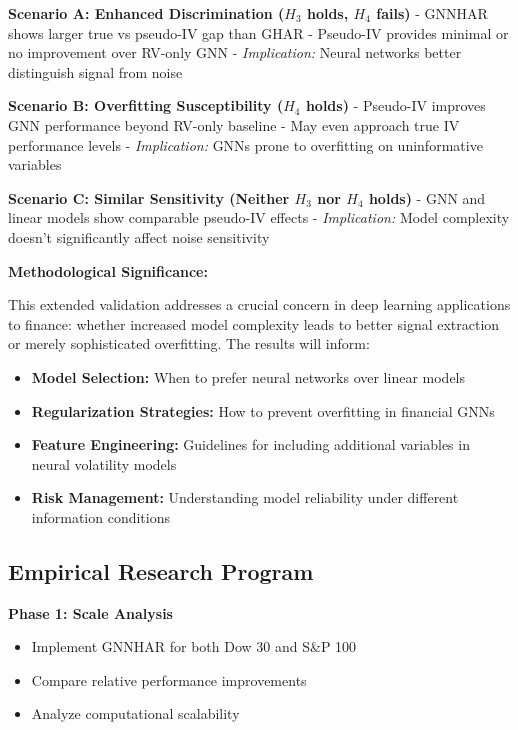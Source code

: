 \documentclass[12pt,a4paper]{article}
\begin{document}
\textbf{Scenario A: Enhanced Discrimination ($H_3$ holds, $H_4$ fails)}
- GNNHAR shows larger true vs pseudo-IV gap than GHAR
- Pseudo-IV provides minimal or no improvement over RV-only GNN
- \textit{Implication:} Neural networks better distinguish signal from noise

\textbf{Scenario B: Overfitting Susceptibility ($H_4$ holds)}
- Pseudo-IV improves GNN performance beyond RV-only baseline
- May even approach true IV performance levels
- \textit{Implication:} GNNs prone to overfitting on uninformative variables

\textbf{Scenario C: Similar Sensitivity (Neither $H_3$ nor $H_4$ holds)}
- GNN and linear models show comparable pseudo-IV effects
- \textit{Implication:} Model complexity doesn't significantly affect noise sensitivity

\textbf{Methodological Significance:}

This extended validation addresses a crucial concern in deep learning applications to finance: whether increased model complexity leads to better signal extraction or merely sophisticated overfitting. The results will inform:

\begin{itemize}
\item \textbf{Model Selection:} When to prefer neural networks over linear models
\item \textbf{Regularization Strategies:} How to prevent overfitting in financial GNNs
\item \textbf{Feature Engineering:} Guidelines for including additional variables in neural volatility models
\item \textbf{Risk Management:} Understanding model reliability under different information conditions
\end{itemize}

\subsection{Empirical Research Program}

\textbf{Phase 1: Scale Analysis}
\begin{itemize}
\item Implement GNNHAR for both Dow 30 and S\&P 100
\item Compare relative performance improvements
\item Analyze computational scalability
\end{itemize}
\end{document}

